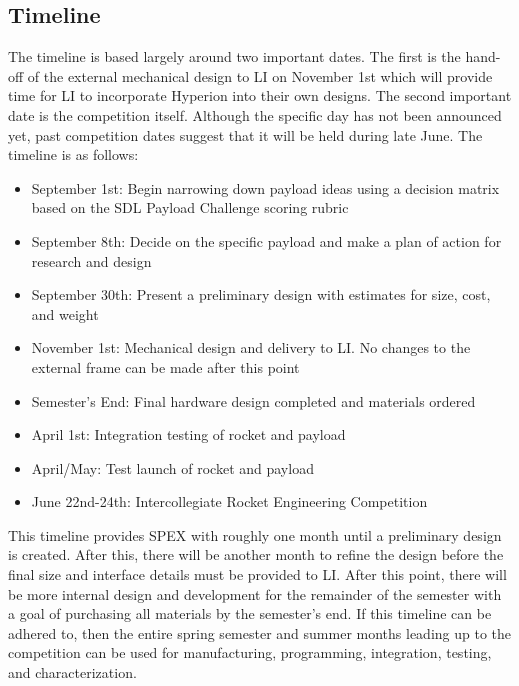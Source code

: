 \documentclass[conference]{IEEEtran} %
\begin{document}
\subsection{Timeline}
\label{subsec:Timeline}
The timeline is based largely around two important dates. The first is the hand-off of the external mechanical design to LI on November 1st which will provide time for LI
to incorporate Hyperion into their own designs. The second important date is the competition itself. Although the specific day has not been announced yet, past competition dates
suggest that it will be held during late June. The timeline is as follows:
\begin{itemize}
  \item September 1st: Begin narrowing down payload ideas using a decision matrix based on the SDL Payload Challenge scoring rubric
  \item September 8th: Decide on the specific payload and make a plan of action for research and design
  \item September 30th: Present a preliminary design with estimates for size, cost, and weight
  \item November 1st: Mechanical design and delivery to LI. No changes to the external frame can be made after this point
  \item Semester's End: Final hardware design completed and materials ordered
  \item April 1st: Integration testing of rocket and payload
  \item April/May: Test launch of rocket and payload
  \item June 22nd-24th: Intercollegiate Rocket Engineering Competition
\end{itemize}

This timeline provides SPEX with roughly one month until a preliminary design is created. After this, there will be another month to refine
the design before the final size and interface details must be provided to LI. After this point, there will be more internal
design and development for the remainder of the semester with a goal of purchasing all materials by the semester's end.
If this timeline can be adhered to, then the entire spring semester and summer months leading up to the competition can be
used for manufacturing, programming, integration, testing, and characterization.
\end{document}
